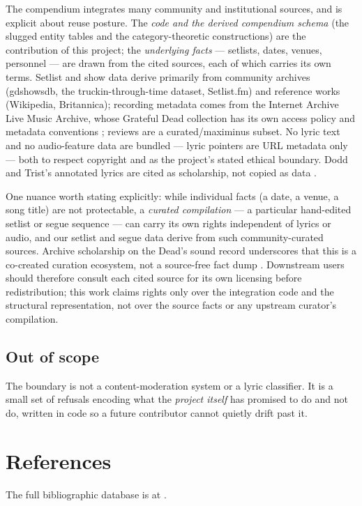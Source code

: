 \documentclass[
]{article}
\begin{document}
The compendium integrates many community and institutional sources, and
is explicit about reuse posture. The \emph{code and the derived
compendium schema} (the slugged entity tables and the category-theoretic
constructions) are the contribution of this project; the
\emph{underlying facts} --- setlists, dates, venues, personnel --- are
drawn from the cited sources, each of which carries its own terms.
Setlist and show data derive primarily from community archives
(gdshowsdb, the truckin-through-time dataset, Setlist.fm) and reference
works (Wikipedia, Britannica); recording metadata comes from the
Internet Archive Live Music Archive, whose Grateful Dead collection has
its own access policy and metadata conventions
\citep{internet_archive_gd_collection_policy}; reviews are a
curated/maximinus subset. No lyric text and no audio-feature data are
bundled --- lyric pointers are URL metadata only --- both to respect
copyright and as the project's stated ethical boundary. Dodd and Trist's
annotated lyrics are cited as scholarship, not copied as data
\citep{dodd_annotated_lyrics}.

One nuance worth stating explicitly: while individual facts (a date, a
venue, a song title) are not protectable, a \emph{curated compilation}
--- a particular hand-edited setlist or segue sequence --- can carry its
own rights independent of lyrics or audio, and our setlist and segue
data derive from such community-curated sources. Archive scholarship on
the Dead's sound record underscores that this is a co-created curation
ecosystem, not a source-free fact dump
\citep{wallace_cocreation_sound_archive, dead_net_taping_dead}.
Downstream users should therefore consult each cited source for its own
licensing before redistribution; this work claims rights only over the
integration code and the structural representation, not over the source
facts or any upstream curator's compilation.

\subsection{Out of scope}\label{out-of-scope}

The boundary is not a content-moderation system or a lyric classifier.
It is a small set of refusals encoding what the \emph{project itself}
has promised to do and not do, written in code so a future contributor
cannot quietly drift past it.

\newpage

\section{References}\label{references}

The full bibliographic database is at
.



\clearpage


\end{document}
